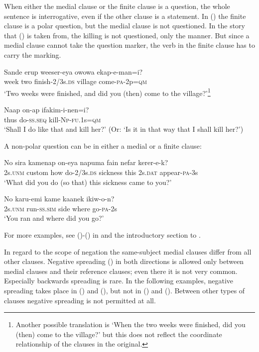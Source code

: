 When either the medial clause or the finite clause is a question, the whole sentence is interrogative, even if the other clause is a statement. In () the finite clause is a polar question, but the medial clause is not questioned. In the story that () is taken from, the killing is not questioned, only the manner. But since a medial clause cannot take the question marker, the verb in the finite clause has to carry the marking.

\ea%
\label{ex:x1449}
\gll Sande  erup  weeser-eya  owowa  ekap-e-man=i? \\
week  two  finish-2/3s.\textsc{ds} village  come-\textsc{pa}-2p=\textsc{qm}\\
\glt`Two weeks were finished, and did you (then) come to the village?'\footnote{Another possible translation is `When the two weeks were finished, did you (then) come to the village?' but this does not reflect the coordinate relationship of the clauses in the original.}
\z


\ea%
\label{ex:x1452}
\gll Naap  on-ap  ifakim-i-nen=i?\\
thus do-\textsc{ss}.\textsc{seq} kill-\textsc{Np}-\textsc{fu}.1s=\textsc{qm}\\
\glt`Shall I do like that and kill her?' (Or: `Is it in that way that I shall kill her?')
\z


A non-polar question can be in either a medial or a finite clause:

\ea%
\label{ex:x1451}
\gll No  sira  kamenap  on-eya  napuma  fain nefar  kerer-e-k?\\
2s.\textsc{unm} custom  how  do-2/3s.\textsc{ds} sickness  this 2s.\textsc{dat} appear-\textsc{pa}-3s\\
\glt`What did you do (so that) this sickness came to you?'
\z


\ea%
\label{ex:x1450}
\gll No  karu-emi  kame  kaanek  ikiw-o-n? \\
2s.\textsc{unm} run-\textsc{ss}.\textsc{sim} side  where  go-\textsc{pa}-2s\\
\glt`You ran and where did you go?'
\z


For more examples, see ()-() in  and the introductory section to . 

In regard to the scope of negation the same-subject medial clauses differ from all other clauses.  Negative spreading () in both directions is allowed only between  medial clauses and their reference clauses; even there it is not very common. Especially backwards spreading is rare. In the following examples, negative spreading takes place in () and (), but not in () and (). Between other types of clauses negative spreading is not permitted at all. 

